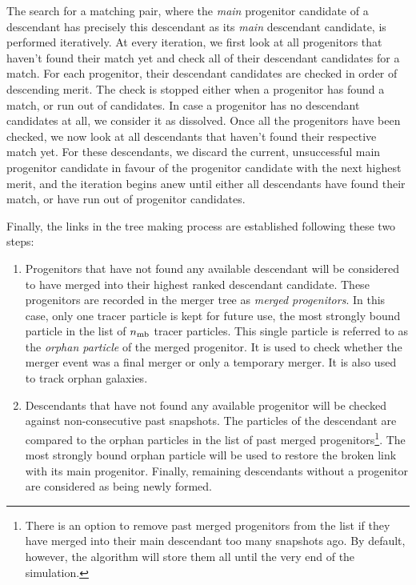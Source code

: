The search for a matching pair, where the \textit{main} progenitor candidate of a 
descendant has precisely this descendant as its \textit{main} descendant 
candidate, is performed iteratively. 
At every iteration, we first look at all progenitors that haven't found their match 
yet and check all of their descendant candidates for a match. For each progenitor, 
their descendant candidates are checked in order of descending merit. The check is 
stopped either when a progenitor has found a match, or run out of candidates. In 
case a progenitor has no descendant candidates at all, we consider it as dissolved.
Once all the progenitors have been checked, we now look at all descendants
that haven't found their respective match yet. For these descendants, we discard the
current, unsuccessful main progenitor candidate in favour of the progenitor candidate
with the next highest merit, and the iteration begins anew until either all descendants
have found their match, or have run out of progenitor candidates. 

Finally, the links in the tree making
process are established following these two steps:

\begin{enumerate}
  
\item Progenitors that have not found any available descendant will be
  considered to have merged into their highest ranked descendant
  candidate.  These progenitors are recorded in the merger tree as
  {\it merged progenitors}.  In this case, only one tracer particle is
  kept for future use, the most strongly bound particle in the list of $n_{\rm
    mb}$ tracer particles.  This single particle is referred to as the
  \emph{orphan particle} of the merged progenitor.  It is used to
  check whether the merger event was a final merger or only a
  temporary merger. It is also used to track orphan galaxies.

\item Descendants that have not found any available progenitor will be
  checked against non-consecutive past snapshots. The particles of the
  descendant are compared to the orphan particles in the list of past
  merged progenitors\footnote{There is an option to remove past merged
  progenitors from the list if they have merged into their main
  descendant too many snapshots ago.  By default, however, the
  algorithm will store them all until the very end of the
  simulation.}.  The most strongly bound orphan particle will be used
  to restore the broken link with its main progenitor.  Finally,
  remaining descendants without a progenitor are considered as being
  newly formed.

\end{enumerate}

